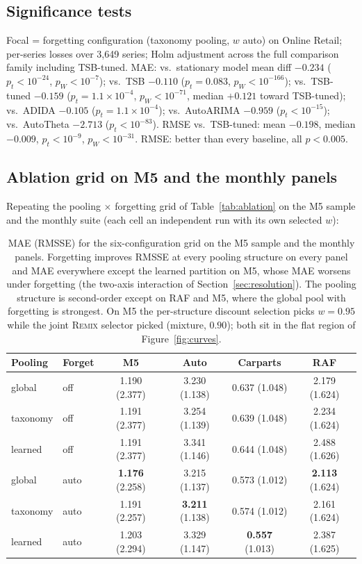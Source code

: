 \documentclass[twocolumn,10pt]{article}
\newcommand{\REMIX}{\textsc{Remix}}
\begin{document}
\subsection{Significance tests}
Focal = forgetting configuration (taxonomy pooling, $w$ auto) on Online
Retail; per-series losses over 3{,}649 series; Holm adjustment across
the full comparison family including TSB-tuned.
MAE: vs.\ stationary model mean diff $-0.234$ ($p_t<10^{-24}$,
$p_W<10^{-7}$); vs.\ TSB $-0.110$ ($p_t=0.083$, $p_W<10^{-166}$);
vs.\ TSB-tuned $-0.159$ ($p_t=1.1\times10^{-4}$, $p_W<10^{-71}$,
median $+0.121$ toward TSB-tuned);
vs.\ ADIDA $-0.105$ ($p_t=1.1\times10^{-4}$); vs.\ AutoARIMA $-0.959$
($p_t<10^{-15}$); vs.\ AutoTheta $-2.713$ ($p_t<10^{-83}$).
RMSE vs.\ TSB-tuned: mean $-0.198$, median $-0.009$, $p_t<10^{-9}$,
$p_W<10^{-31}$.
RMSE: better than every baseline, all $p<0.005$.

\subsection{Ablation grid on M5 and the monthly panels}
Repeating the pooling $\times$ forgetting grid of
Table~\ref{tab:ablation} on the M5 sample and the monthly suite (each
cell an independent run with its own selected $w$):

\begin{table}[h]
\centering
\caption{MAE (RMSSE) for the six-configuration grid on the M5 sample
and the monthly panels. Forgetting improves RMSSE at every pooling
structure on every panel and MAE everywhere except the learned
partition on M5, whose MAE worsens under forgetting (the two-axis
interaction of Section~\ref{sec:resolution}). The pooling structure is
second-order except on RAF and M5, where the global pool with
forgetting is strongest. On M5 the per-structure discount selection
picks $w{=}0.95$ while the joint \REMIX{} selector picked (mixture,
$0.90$); both sit in the flat region of Figure~\ref{fig:curves}.}
\small
\setlength{\tabcolsep}{3.0pt}
\begin{tabular}{llcccc}
\toprule
Pooling & Forget & M5 & Auto & Carparts & RAF\\
\midrule
global & off & 1.190 (2.377) & 3.230 (1.138) & 0.637 (1.048) & 2.179 (1.624)\\
taxonomy & off & 1.191 (2.377) & 3.254 (1.139) & 0.639 (1.048) & 2.234 (1.624)\\
learned & off & 1.191 (2.377) & 3.341 (1.146) & 0.644 (1.048) & 2.488 (1.626)\\
global & auto & \textbf{1.176} (2.258) & 3.215 (1.137) & 0.573 (1.012) & \textbf{2.113} (1.624)\\
taxonomy & auto & 1.191 (2.257) & \textbf{3.211} (1.138) & 0.574 (1.012) & 2.161 (1.624)\\
learned & auto & 1.203 (2.294) & 3.329 (1.147) & \textbf{0.557} (1.013) & 2.387 (1.625)\\
\bottomrule
\end{tabular}
\end{table}
\end{document}
